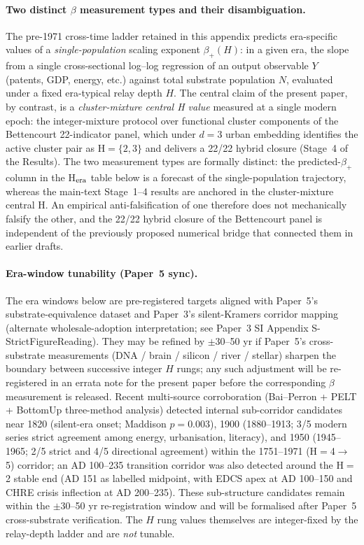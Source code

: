 \paragraph{Two distinct $\beta$ measurement types and their disambiguation.}
The pre-1971 cross-time ladder retained in this appendix predicts era-specific values of a \emph{single-population} scaling exponent $\beta_+(H)$: in a given era, the slope from a single cross-sectional log--log regression of an output observable $Y$ (patents, GDP, energy, etc.) against total substrate population $N$, evaluated under a fixed era-typical relay depth $H$. The central claim of the present paper, by contrast, is a \emph{cluster-mixture central H value} measured at a single modern epoch: the integer-mixture protocol over functional cluster components of the Bettencourt 22-indicator panel, which under $d{=}3$ urban embedding identifies the active cluster pair as H$=\{2,3\}$ and delivers a 22/22 hybrid closure (Stage~4 of the Results). The two measurement types are formally distinct: the predicted-$\beta_+$ column in the H$_{\rm era}$ table below is a forecast of the single-population trajectory, whereas the main-text Stage~1--4 results are anchored in the cluster-mixture central H. An empirical anti-falsification of one therefore does not mechanically falsify the other, and the 22/22 hybrid closure of the Bettencourt panel is independent of the previously proposed numerical bridge that connected them in earlier drafts.

\paragraph{Era-window tunability (Paper~5 sync).} The era windows below are pre-registered targets aligned with Paper~5's substrate-equivalence dataset and Paper~3's silent-Kramers corridor mapping (alternate wholesale-adoption interpretation; see Paper~3 SI Appendix S-StrictFigureReading). They may be refined by $\pm$30--50 yr if Paper~5's cross-substrate measurements (DNA / brain / silicon / river / stellar) sharpen the boundary between successive integer $H$ rungs; any such adjustment will be re-registered in an errata note for the present paper before the corresponding $\beta$ measurement is released. Recent multi-source corroboration (Bai--Perron + PELT + BottomUp three-method analysis) detected internal sub-corridor candidates near 1820 (silent-era onset; Maddison $p=0.003$), 1900 (1880--1913; 3/5 modern series strict agreement among energy, urbanisation, literacy), and 1950 (1945--1965; 2/5 strict and 4/5 directional agreement) within the 1751--1971 (H${=}$4$\to$5) corridor; an AD 100--235 transition corridor was also detected around the H${=}$2 stable end (AD 151 as labelled midpoint, with EDCS apex at AD 100--150 and CHRE crisis inflection at AD 200--235). These sub-structure candidates remain within the $\pm$30--50 yr re-registration window and will be formalised after Paper~5 cross-substrate verification. The $H$ rung values themselves are integer-fixed by the relay-depth ladder and are \emph{not} tunable.

